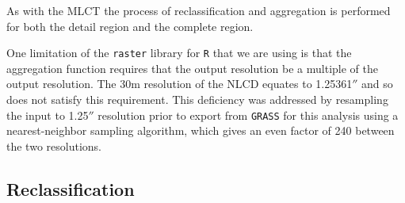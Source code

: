 As with the MLCT the process of reclassification and aggregation is
performed for both the detail region and the complete region.

One limitation of the \texttt{raster} library for \texttt{R} that we
are using is that the aggregation function requires that the output
resolution be a multiple of the output resolution.  The 30m resolution
of the NLCD equates to 1.25361$''$ and so does not satisfy this
requirement.  This deficiency was addressed by resampling the input to
1.25$''$ resolution prior to export from \texttt{GRASS} for this
analysis using a nearest-neighbor sampling algorithm, which gives an
even factor of 240 between the two resolutions.



\subsection{Reclassification}
\label{sec:nlcd-reclass}



